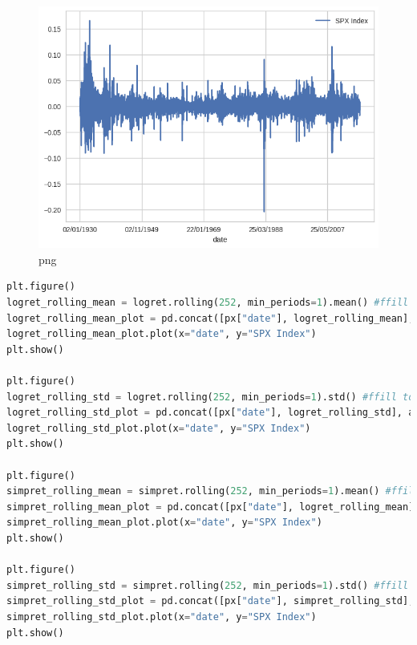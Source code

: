 \begin{figure}
\centering
\includegraphics{ProcessingStockPriceData_files/ProcessingStockPriceData_7_2.png}
\caption{png}
\end{figure}

\begin{lstlisting}[language=Python]
plt.figure()
logret_rolling_mean = logret.rolling(252, min_periods=1).mean() #ffill to fill the missing values and min periods 1 to take the first 251 values without rolling
logret_rolling_mean_plot = pd.concat([px["date"], logret_rolling_mean], axis=1)
logret_rolling_mean_plot.plot(x="date", y="SPX Index")
plt.show()

plt.figure()
logret_rolling_std = logret.rolling(252, min_periods=1).std() #ffill to fill the missing values and min periods 1 to take the first 251 values without rolling
logret_rolling_std_plot = pd.concat([px["date"], logret_rolling_std], axis=1)
logret_rolling_std_plot.plot(x="date", y="SPX Index")
plt.show()

plt.figure()
simpret_rolling_mean = simpret.rolling(252, min_periods=1).mean() #ffill to fill the missing values and min periods 1 to take the first 251 values without rolling
simpret_rolling_mean_plot = pd.concat([px["date"], logret_rolling_mean], axis=1)
simpret_rolling_mean_plot.plot(x="date", y="SPX Index")
plt.show()

plt.figure()
simpret_rolling_std = simpret.rolling(252, min_periods=1).std() #ffill to fill the missing values and min periods 1 to take the first 251 values without rolling
simpret_rolling_std_plot = pd.concat([px["date"], simpret_rolling_std], axis=1)
simpret_rolling_std_plot.plot(x="date", y="SPX Index")
plt.show()
\end{lstlisting}

